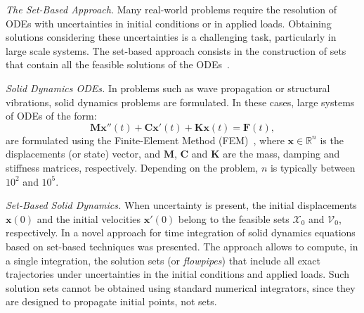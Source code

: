 \documentclass{juliacon}
\begin{document}
	


\maketitle

\emph{The Set-Based Approach.} %
%
Many real-world problems require the resolution of ODEs with uncertainties in initial conditions or in applied loads. Obtaining solutions considering these uncertainties is a challenging task, particularly in large scale systems. %
%
The set-based approach consists in the construction of sets that contain all the feasible solutions of the ODEs~\cite{althoff2020set}. %


\vspace{0.2cm}

\emph{Solid Dynamics ODEs.} %
%
In problems such as wave propagation or structural vibrations, solid dynamics problems are formulated. %
%
In these cases, large systems of ODEs of the form:
%
\begin{equation}\label{eq:second_order}
\mathbf{M} \mathbf{x}''(t) + \mathbf{C}\mathbf{x}'(t) + \mathbf{K}\mathbf{x}(t) = \mathbf{F}(t),
\end{equation}
%
are formulated using the Finite-Element Method (FEM)~\cite{Bathe2014}, where $\mathbf{x} \in \mathbb{R}^n$ is the displacements (or state) vector, and $\mathbf{M}$, $\mathbf{C}$ and $\mathbf{K}$ are the mass, damping and stiffness matrices, respectively. Depending on the problem, $n$ is typically  between $10^2$ and $10^5$.

	
\vspace{0.2cm}

\emph{Set-Based Solid Dynamics.} %
%
When uncertainty is present, the initial displacements $\mathbf{x}(0)$ and the initial velocities $\mathbf{x}'(0)$ belong to the feasible sets $\mathcal{X}_0$ and  $\mathcal{V}_0$, respectively. %
%
In \cite{forets2021combining} a novel approach for time integration of solid dynamics equations based on set-based techniques was presented. %
%
The approach allows to compute, in a single integration, the solution sets (or \emph{flowpipes}) that include all exact trajectories under uncertainties in the initial conditions and applied loads.
%
Such solution sets cannot be obtained using standard numerical integrators, since they are designed to propagate initial points, not sets.

\vspace{0.2cm}
\end{document}
